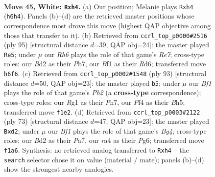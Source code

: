 \documentclass[11pt]{article}
\begin{document}
\clearpage

\begin{figure}[p]\centering
\begin{subfigure}{0.46\textwidth}\centering
\resizebox{\linewidth}{!}{%
\newchessgame
\chessboard[
  setfen={4n3/p1p5/2k2p1R/8/r4P1p/r7/1K1B3P/5BR1 w - - 4 45},
  showmover=false,
  pgfstyle=straightmove, color=movearrow, markmove={h6-h4}
]}
\caption{}
\end{subfigure}\hfill
\begin{subfigure}{0.46\textwidth}\centering
\resizebox{\linewidth}{!}{%
\newchessgame
\chessboard[
  setfen={7k/1p6/3r2pp/1B1b4/R6P/2P3R1/4r1PK/8 b - - 2 48},
  showmover=false,
  pgfstyle=straightmove, color=movearrow, markmove={e2-e5}
]}
\caption{}
\end{subfigure}
\\[4pt]
\begin{subfigure}{0.46\textwidth}\centering
\resizebox{\linewidth}{!}{%
\newchessgame
\chessboard[
  setfen={8/1p3k1p/5p2/7b/p3N2P/P2r1PK1/1P3R2/8 b - - 1 47},
  showmover=false,
  pgfstyle=straightmove, color=movearrow, markmove={b7-b5}
]}
\caption{}
\end{subfigure}\hfill
\begin{subfigure}{0.46\textwidth}\centering
\resizebox{\linewidth}{!}{%
\newchessgame
\chessboard[
  setfen={3r4/p4k2/3P2pp/1p4b1/6N1/PP6/3R1PK1/4R3 b - - 0 37},
  showmover=false,
  pgfstyle=straightmove, color=movearrow, markmove={g5-d2}
]}
\caption{}
\end{subfigure}
\caption{\textbf{Move 45, White: \texttt{Rxh4}.} (a) Our position; Melanie plays \texttt{Rxh4} (\texttt{h6h4}). Panels (b)--(d) are the retrieved master positions whose correspondence most drove this move (highest QAP objective among those that transfer to it). (b) Retrieved from \texttt{ccrl\_top\_p0000\#2516} (ply 95) [structural distance $d$=39, QAP obj=24]: the master played \texttt{Re5}; under $\mu$ our \emph{Rh6} plays the role of that game's \emph{Re7}; cross-type roles: our \emph{B}d2 as their \emph{P}b7, our \emph{B}f1 as their \emph{R}d6; transferred move \texttt{h6f6}. (c) Retrieved from \texttt{ccrl\_top\_p0002\#1548} (ply 93) [structural distance $d$=50, QAP obj=23]: the master played \texttt{b5}; under $\mu$ our \emph{Bf1} plays the role of that game's \emph{Pb2} (a \textbf{cross-type} correspondence); cross-type roles: our \emph{R}g1 as their \emph{P}h7, our \emph{P}f4 as their \emph{B}h5; transferred move \texttt{f1e2}. (d) Retrieved from \texttt{ccrl\_top\_p0003\#2122} (ply 73) [structural distance $d$=47, QAP obj=23]: the master played \texttt{Bxd2}; under $\mu$ our \emph{Bf1} plays the role of that game's \emph{Bg4}; cross-type roles: our \emph{B}d2 as their \emph{P}a7, our \emph{r}a4 as their \emph{P}g6; transferred move \texttt{f1a6}. Synthesis: no retrieved analog transferred to \texttt{Rxh4} -- the \texttt{search} selector chose it on value (material / mate); panels (b)--(d) show the strongest nearby analogies.}
\label{fig:thought-m88}
\end{figure}
\end{document}
